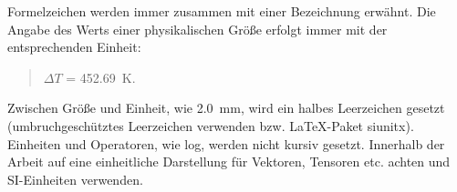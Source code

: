 Formelzeichen werden immer zusammen mit einer Bezeichnung erwähnt. Die Angabe des Werts einer physikalischen Größe erfolgt immer mit der entsprechenden Einheit:

\begin{quote}
	$\Delta T$ = \SI{452,69}{\kelvin}.
\end{quote}

Zwischen Größe und Einheit, wie \SI{2,0}{\mm}, wird ein halbes Leerzeichen gesetzt (umbruchgeschütztes Leerzeichen verwenden bzw. \LaTeX-Paket siunitx). Einheiten und Operatoren, wie \glqq log\grqq, werden nicht kursiv gesetzt. Innerhalb der Arbeit auf eine einheitliche Darstellung für Vektoren, Tensoren etc. achten und SI-Einheiten verwenden.


%

